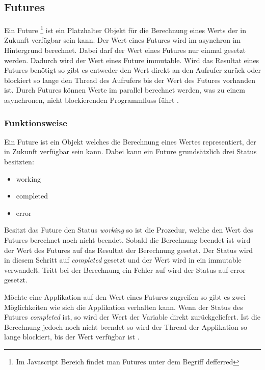 \subsection{Futures}
\label{section:futures}

Ein Future \footnote{Im Javascript Bereich findet man Futures unter dem Begriff defferred} ist ein Platzhalter Objekt für die Berechnung eines Werts der in Zukunft verfügbar sein kann. Der Wert eines Futures wird im asynchron im Hintergrund berechnet. Dabei darf der Wert eines Futures nur einmal gesetzt werden. Dadurch wird der Wert eines Future immutable. Wird das Resultat eines Futures benötigt so gibt es entweder den Wert direkt an den Aufrufer zurück oder blockiert so lange den Thread des Aufrufers bis der Wert des Futures vorhanden ist. Durch Futures können Werte im parallel berechnet werden, was zu einem asynchronen, nicht blockierenden Programmfluss führt \cite[]{ScalaFutures}. 

\subsubsection{Funktionsweise} 

Ein Future ist ein Objekt welches die Berechnung eines Wertes representiert, der in Zukunft verfügbar sein kann. Dabei kann ein Future grundsätzlich drei Status besitzten: 

\begin{itemize}
  \item working
  \item completed
  \item error
\end{itemize}  

Besitzt das Future den Status \emph{working} so ist die Prozedur, welche den Wert des Futures berechnet noch nicht beendet. Sobald die Berechnung beendet ist wird der Wert des Futures auf das Resultat der Berechnung gesetzt. Der Status wird in diesem Schritt auf \emph{completed} gesetzt und der Wert wird in ein immutable verwandelt. Tritt bei der Berechnung ein Fehler auf wird der Status auf error gesetzt. 

Möchte eine Applikation auf den Wert eines Futures zugreifen so gibt es zwei Möglichkeiten wie sich die Applikation verhalten kann. Wenn der Status des Futures \emph{completed} ist, so wird der Wert der Variable direkt zurückgeliefert. Ist die Berechnung jedoch noch nicht beendet so wird der Thread der Applikation so lange blockiert, bis der Wert verfügbar ist \cite[]{ScalaFutures}.


